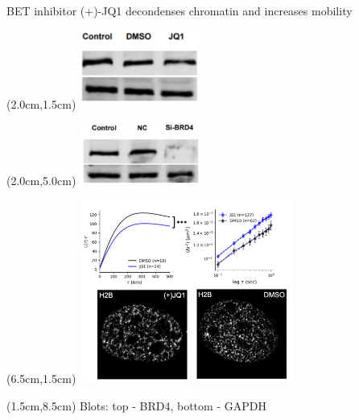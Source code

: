 \documentclass{beamer}					%
\begin{document}
\begin{frame}{BET inhibitor (+)-JQ1 decondenses chromatin and increases mobility}

\begin{textblock*}{4cm}(2.0cm,1.5cm)
\includegraphics[width=4cm]{media/JQ1-Blot}
\end{textblock*}

\begin{textblock*}{4cm}(2.0cm,5.0cm)
\includegraphics[width=4cm]{media/Silence-Blot}
\end{textblock*}

\begin{textblock*}{7cm}(6.5cm,1.5cm)
\includegraphics[width=7cm]{media/JQ1}
\end{textblock*}

\begin{textblock*}{7cm}(1.5cm,8.5cm)
Blots: top - BRD4, bottom - GAPDH
\end{textblock*}

\end{frame}
\end{document}
